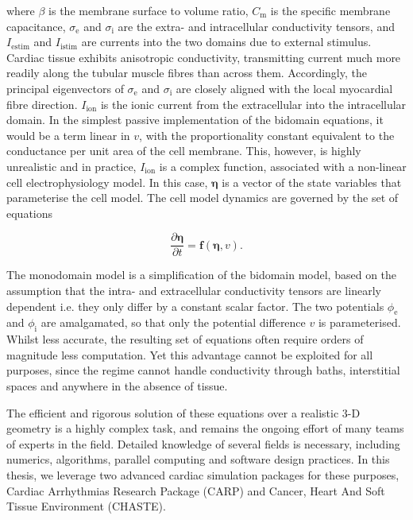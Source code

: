   where $\beta$ is the membrane surface to volume ratio, $C_\text{m}$ is the specific membrane capacitance, $\sigma_\text{e}$ and $\sigma_\text{i}$ are the extra- and intracellular conductivity tensors, and $I_\text{estim}$ and $I_\text{istim}$ are currents into the two domains due to external stimulus. Cardiac tissue exhibits anisotropic conductivity, transmitting current much more readily along the tubular muscle fibres than across them. Accordingly, the principal eigenvectors of $\sigma_\text{e}$ and $\sigma_\text{i}$ are closely aligned with the local myocardial fibre direction. $I_\text{ion}$ is the ionic current from the extracellular into the intracellular domain. In the simplest passive implementation of the bidomain equations, it would be a term linear in $v$, with the proportionality constant equivalent to the conductance per unit area of the cell membrane. This, however, is highly unrealistic and in practice, $I_\text{ion}$ is a complex function, associated with a non-linear cell electrophysiology model. In this case, $\boldsymbol\eta$ is a vector of the state variables that parameterise the cell model. The cell model dynamics are governed by the set of equations
  
  \begin{equation}
    \frac{\partial \boldsymbol\eta}{\partial t} = \mathbf{f}\left(\boldsymbol\eta, v \right).
  \end{equation}
  
  The monodomain model is a simplification of the bidomain model, based on the assumption that the intra- and extracellular conductivity tensors are linearly dependent i.e. they only differ by a constant scalar factor. The two potentials $\phi_\text{e}$ and $\phi_\text{i}$ are amalgamated, so that only the potential difference $v$ is parameterised. Whilst less accurate, the resulting set of equations often require orders of magnitude less computation. Yet this advantage cannot be exploited for all purposes, since the regime cannot handle conductivity through baths, interstitial spaces and anywhere in the absence of tissue.
  
  The efficient and rigorous solution of these equations over a realistic 3-D geometry is a highly complex task, and remains the ongoing effort of many teams of experts in the field. Detailed knowledge of several fields is necessary, including numerics, algorithms, parallel computing and software design practices. In this thesis, we leverage two advanced cardiac simulation packages for these purposes, Cardiac Arrhythmias Research Package (CARP) and Cancer, Heart And Soft Tissue Environment (CHASTE).

